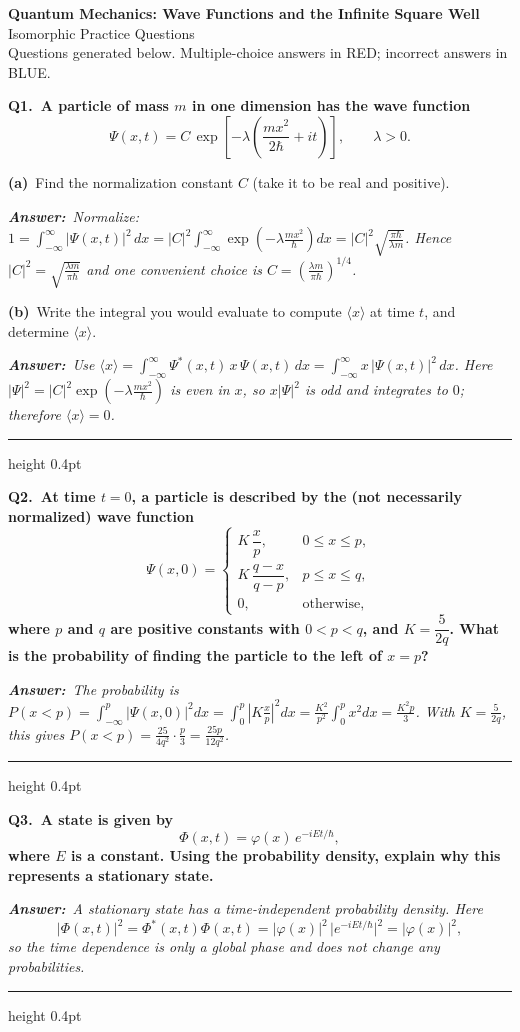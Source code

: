 \documentclass[11pt]{article}
\newcommand{\QuestionStyle}[1]{{\large\bfseries\boldmath #1}}
\newcommand{\OEBlock}[3]{%
  \Needspace{5\baselineskip}%
  \noindent
  \begin{minipage}{\linewidth}
    \QuestionStyle{#1.~#2}

    \vspace{0.25em}
    \noindent\textcolor{AnsRed}{\textit{\textbf{Answer:}~#3}}

    \vspace{0.25em}
    \hrule height 0.4pt
  \end{minipage}
  \vspace{0.75em}
}
\newcommand{\MPBlock}[3]{%
  \Needspace{8\baselineskip}%
  \noindent
  \begin{minipage}{\linewidth}
    \QuestionStyle{#1.~#2}

    \vspace{0.25em}
    #3

    \vspace{0.25em}
    \hrule height 0.4pt
  \end{minipage}
  \vspace{0.75em}
}
\newcommand{\OEPart}[3]{%
  \par\vspace{0.35em}
  \noindent\textbf{(#1)}~#2
  \par\vspace{0.15em}
  \noindent\textit{\textbf{Answer:}~#3}
  \par
}
\begin{document}
\begin{center}
{\huge \textbf{Quantum Mechanics: Wave Functions and the Infinite Square Well}}\\[0.25em]
{\Large Isomorphic Practice Questions}\\[0.25em]
{\large Questions generated below. Multiple-choice answers in RED; incorrect answers in BLUE.}
\end{center}

\vspace{0.75em}

\MPBlock{Q1}{A particle of mass $m$ in one dimension has the wave function
\[
\Psi(x,t)=C\,\exp\!\left[-\lambda\left(\frac{m x^2}{2\hbar}+ i t\right)\right],\qquad \lambda>0.
\]
}{
  \OEPart{a}{Find the normalization constant $C$ (take it to be real and positive).}{Normalize: $1=\int_{-\infty}^{\infty}|\Psi(x,t)|^2\,dx=|C|^2\int_{-\infty}^{\infty}\exp\!\left(-\lambda\frac{m x^2}{\hbar}\right)dx=|C|^2\sqrt{\frac{\pi\hbar}{\lambda m}}$. Hence $|C|^2=\sqrt{\frac{\lambda m}{\pi\hbar}}$ and one convenient choice is $C=\left(\frac{\lambda m}{\pi\hbar}\right)^{1/4}$.}
  \OEPart{b}{Write the integral you would evaluate to compute $\langle x\rangle$ at time $t$, and determine $\langle x\rangle$.}{Use $\langle x\rangle=\int_{-\infty}^{\infty}\Psi^*(x,t)\,x\,\Psi(x,t)\,dx=\int_{-\infty}^{\infty}x\,|\Psi(x,t)|^2\,dx$. Here $|\Psi|^2=|C|^2\exp\!\left(-\lambda\frac{m x^2}{\hbar}\right)$ is even in $x$, so $x|\Psi|^2$ is odd and integrates to $0$; therefore $\langle x\rangle=0$.}
}

\OEBlock{Q2}{At time $t=0$, a particle is described by the (not necessarily normalized) wave function
\[
\Psi(x,0)=
\begin{cases}
K\,\dfrac{x}{p}, & 0\le x\le p,\\[6pt]
K\,\dfrac{q-x}{q-p}, & p\le x\le q,\\[6pt]
0, & \text{otherwise},
\end{cases}
\]
where $p$ and $q$ are positive constants with $0<p<q$, and $K=\dfrac{5}{2q}$. What is the probability of finding the particle to the left of $x=p$?}{The probability is $P(x<p)=\int_{-\infty}^{p}|\Psi(x,0)|^2dx=\int_{0}^{p}\left|K\frac{x}{p}\right|^2dx=\frac{K^2}{p^2}\int_{0}^{p}x^2dx=\frac{K^2 p}{3}$. With $K=\frac{5}{2q}$, this gives $P(x<p)=\frac{25}{4q^2}\cdot\frac{p}{3}=\frac{25p}{12q^2}$.}

\OEBlock{Q3}{A state is given by
\[
\Phi(x,t)=\varphi(x)\,e^{-iEt/\hbar},
\]
where $E$ is a constant. Using the probability density, explain why this represents a stationary state.}{A stationary state has a time-independent probability density. Here
\[
|\Phi(x,t)|^2=\Phi^*(x,t)\Phi(x,t)=|\varphi(x)|^2\,\big|e^{-iEt/\hbar}\big|^2=|\varphi(x)|^2,
\]
so the time dependence is only a global phase and does not change any probabilities.}
\end{document}

